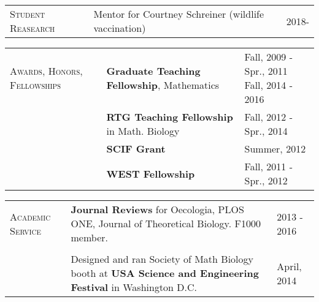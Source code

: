 \documentclass[11pt]{article}
\newcommand{\cellone}{3.5cm} %
\newcommand{\celltwo}{11cm}
\newcommand{\cellthree}{4cm}
\newcommand{\spa}{\vspace{.4in}}
\begin{document}
\spa

\begin{tabularx}{\textwidth}{p{\cellone} p{\celltwo} p{\cellthree}}
  \parbox[t][0cm]{\cellone}{S\textsc{tudent} R\textsc{easearch}} & \parbox[t][]{\celltwo}{Mentor for Courtney Schreiner (wildlife vaccination)} & \parbox[t][0cm]{\cellthree}{2018-} 

\end{tabularx}

\spa

\begin{tabularx}{\textwidth}{p{\cellone} p{\celltwo} p{\cellthree}}
\parbox[t][0cm]{\cellone}{A\textsc{wards}, H\textsc{onors}, F\textsc{ellowships}} & \parbox[t][0cm]{\celltwo}{{\bf Graduate Teaching Fellowship}, Mathematics} & \parbox[t][]{\cellthree}{Fall, 2009 - Spr., 2011 \\ Fall, 2014 - 2016} \\ 
												        & \parbox[t][0cm]{\celltwo}{{\bf RTG Teaching Fellowship} in Math. Biology} & \parbox[t][]{\cellthree}{Fall, 2012 - Spr., 2014} \\
												        &  \parbox[t][0cm]{\celltwo}{{\bf SCIF Grant}}  &  Summer, 2012 \\ 	
												        &  \parbox[t][0cm]{\celltwo}{{\bf WEST Fellowship}}  &  Fall, 2011 - Spr., 2012 \\ 
\end{tabularx}

\spa

\begin{tabularx}{\textwidth}{p{\cellone} p{\celltwo} p{\cellthree}}
\parbox[t][]{\cellone}{A\textsc{cademic} S\textsc{ervice}} & \parbox[t][0cm]{\celltwo}{{\bf Journal Reviews} for Oecologia, PLOS ONE, Journal of Theoretical Biology.  F1000 member. } & \parbox[t][]{\cellthree}{2013 - 2016} \\ \\
                                                                                                      & \parbox[t][0cm]{\celltwo}{Designed and ran Society of Math Biology booth at {\bf USA Science and Engineering Festival} in Washington D.C.} & \parbox[t][]{\cellthree}{April, 2014} 

\end{tabularx}

\spa
\end{document}
